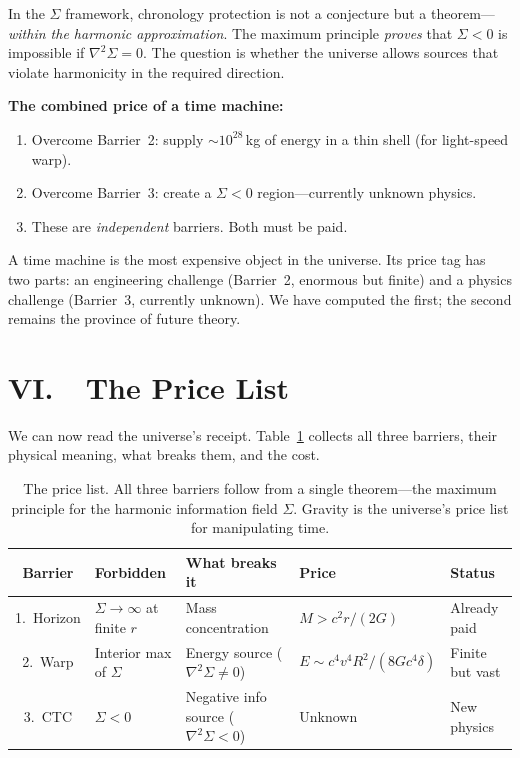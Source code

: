 \documentclass[12pt]{article}
\renewcommand{\baselinestretch}{2.0}
\begin{document}
In the $\Sigma$ framework, chronology protection is not a conjecture
but a theorem---\emph{within the harmonic approximation}. The maximum
principle \emph{proves} that $\Sigma < 0$ is impossible if
$\nabla^2\Sigma = 0$. The question is whether the universe allows
sources that violate harmonicity in the required direction.




\noindent\textbf{The combined price of a time machine:}
\begin{enumerate}
\item Overcome Barrier~2: supply ${\sim}10^{28}$\,kg of
energy in a thin shell (for light-speed warp).
\item Overcome Barrier~3: create a $\Sigma < 0$ region---currently
unknown physics.
\item These are \emph{independent} barriers. Both must be paid.
\end{enumerate}

A time machine is the most expensive object in the universe. Its price
tag has two parts: an engineering challenge (Barrier~2, enormous but
finite) and a physics challenge (Barrier~3, currently unknown). We have
computed the first; the second remains the province of future theory.


\section*{VI.\ \ The Price List}

We can now read the universe's receipt. Table~\ref{tab:pricelist}
collects all three barriers, their physical meaning, what breaks them,
and the cost.

\begin{table}[h]
\renewcommand{\baselinestretch}{1.2}\selectfont
\centering
\begin{tabular}{@{}c p{2.2cm} p{2.4cm} p{3.2cm} l@{}}
\toprule
Barrier & Forbidden & What breaks it & Price & Status \\
\midrule
1.\ Horizon &
$\Sigma \to \infty$ at finite $r$ &
Mass concentration &
$M > c^2 r / (2G)$ &
Already paid \\[4pt]
2.\ Warp &
Interior max of $\Sigma$ &
Energy source ($\nabla^2\Sigma \neq 0$) &
$E \sim c^4 v^4 R^2 / (8Gc^4\delta)$ &
Finite but vast \\[4pt]
3.\ CTC &
$\Sigma < 0$ &
Negative info source ($\nabla^2\Sigma < 0$) &
Unknown &
New physics \\
\bottomrule
\end{tabular}
\caption{The price list. All three barriers follow from a single
theorem---the maximum principle for the harmonic information field
$\Sigma$. Gravity is the universe's price list for manipulating time.}
\label{tab:pricelist}
\end{table}
\end{document}
